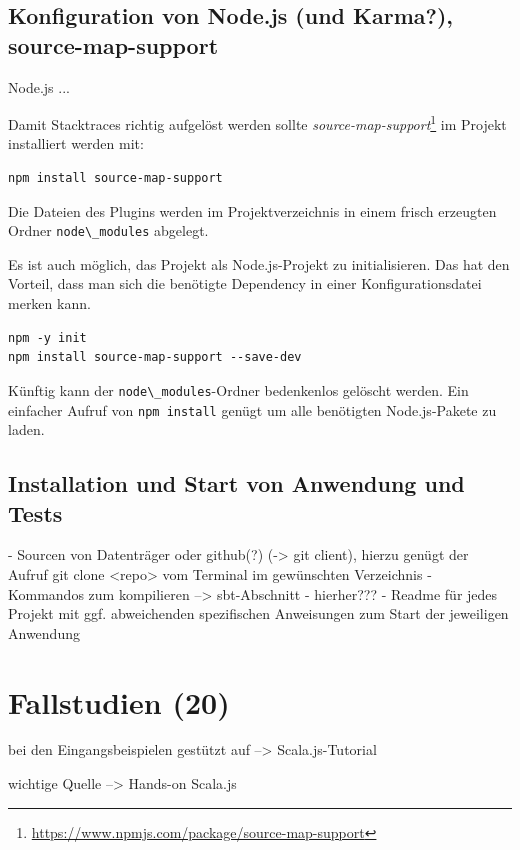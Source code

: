 \documentclass[a4paper, 12pt, hidelinks, listof=totoc, listoftables=totoc, bibliography=totoc]{scrreprt}
\newcommand{\code}[1]{\lstinline[language=Scala, style=inline]|#1|}
\begin{document}
\section{Konfiguration von Node.js (und Karma?), source-map-support}

Node.js ...

Damit Stacktraces richtig aufgelöst werden sollte \textit{source-map-support}\footnote{\url{https://www.npmjs.com/package/source-map-support}} im Projekt installiert werden mit:

\begin{lstlisting}[style=snippet]
npm install source-map-support
\end{lstlisting}

Die Dateien des Plugins werden im Projektverzeichnis in einem frisch erzeugten Ordner \code{node\_modules} abgelegt.

Es ist auch möglich, das Projekt als Node.js-Projekt zu initialisieren. Das hat den Vorteil, dass man sich die benötigte Dependency in einer Konfigurationsdatei merken kann.

\begin{lstlisting}[style=snippet]
npm -y init
npm install source-map-support --save-dev
\end{lstlisting}

Künftig kann der \code{node\_modules}-Ordner bedenkenlos gelöscht werden. Ein einfacher Aufruf von \code{npm install} genügt um alle benötigten Node.js-Pakete zu laden.


\section{Installation und Start von Anwendung und Tests}

- Sourcen von Datenträger oder github(?) (-> git client), hierzu genügt der Aufruf git clone <repo> vom Terminal im gewünschten Verzeichnis
- Kommandos zum kompilieren --> sbt-Abschnitt - hierher???
- Readme für jedes Projekt mit ggf. abweichenden spezifischen Anweisungen zum Start der jeweiligen Anwendung


\chapter{Fallstudien (20)}


bei den Eingangsbeispielen gestützt auf
-->  Scala.js-Tutorial

wichtige Quelle
-->  Hands-on Scala.js
\end{document}
